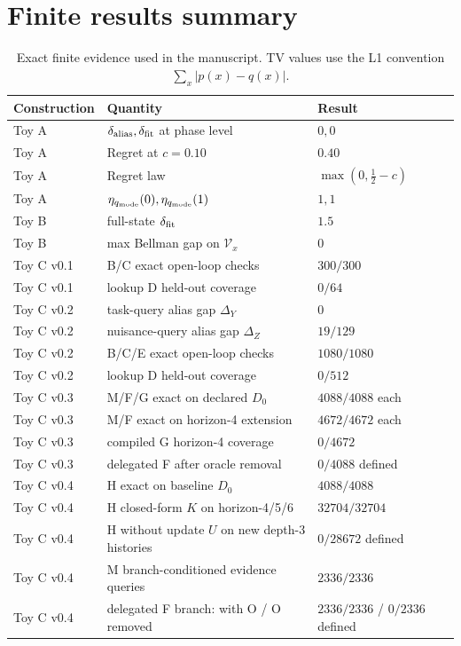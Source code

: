 \documentclass[10pt]{article}
\begin{document}
\clearpage
\appendix
\section{Finite results summary}

\begin{table}[H]
\centering
\caption{Exact finite evidence used in the manuscript. TV values use the L1 convention $\sum_x|p(x)-q(x)|$.}
\begin{tabular}{@{}lll@{}}
\toprule
Construction & Quantity & Result \\
\midrule
Toy A & $\delta_{\rm alias},\delta_{\rm fit}$ at phase level & $0,0$ \\
Toy A & Regret at $c=0.10$ & $0.40$ \\
Toy A & Regret law & $\max(0,\frac12-c)$ \\
Toy A & $\eta_{q_{\rm mode}}(0),\eta_{q_{\rm mode}}(1)$ & $1,1$ \\
Toy B & full-state $\delta_{\rm fit}$ & $1.5$ \\
Toy B & max Bellman gap on $\mathcal V_x$ & $0$ \\
Toy C v0.1 & B/C exact open-loop checks & $300/300$ \\
Toy C v0.1 & lookup D held-out coverage & $0/64$ \\
Toy C v0.2 & task-query alias gap $\Delta_Y$ & $0$ \\
Toy C v0.2 & nuisance-query alias gap $\Delta_Z$ & $19/129$ \\
Toy C v0.2 & B/C/E exact open-loop checks & $1080/1080$ \\
Toy C v0.2 & lookup D held-out coverage & $0/512$ \\
Toy C v0.3 & M/F/G exact on declared $D_0$ & $4088/4088$ each \\
Toy C v0.3 & M/F exact on horizon-4 extension & $4672/4672$ each \\
Toy C v0.3 & compiled G horizon-4 coverage & $0/4672$ \\
Toy C v0.3 & delegated F after oracle removal & $0/4088$ defined \\
Toy C v0.4 & H exact on baseline $D_0$ & $4088/4088$ \\
Toy C v0.4 & H closed-form $K$ on horizon-4/5/6 & $32704/32704$ \\
Toy C v0.4 & H without update $U$ on new depth-3 histories & $0/28672$ defined \\
Toy C v0.4 & M branch-conditioned evidence queries & $2336/2336$ \\
Toy C v0.4 & delegated F branch: with O / O removed & $2336/2336$ / $0/2336$ defined \\

\end{tabular}
\end{table}
\end{document}
